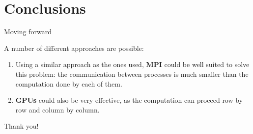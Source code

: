 

\section{Conclusions}


    \begin{frame}{Moving forward}

        A number of different approaches are possible:
        \begin{enumerate}
            \item Using a similar approach as the ones used, \textbf{MPI} could be well suited to solve this problem: the communication between processes is much smaller than the computation done by each of them.
            \item \textbf{GPUs} could also be very effective, as the computation can proceed row by row and column by column.
        \end{enumerate}
    \end{frame}



    \begin{emptyframe}
        Thank you!
    \end{emptyframe}